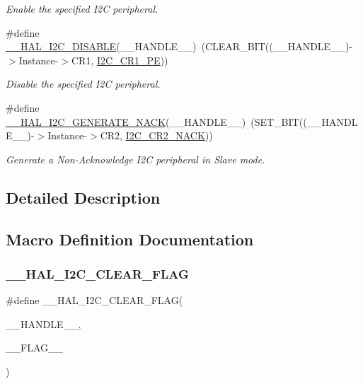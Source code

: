 \begin{DoxyCompactItemize}
\begin{DoxyCompactList}\small\item\em Enable the specified I2C peripheral. \end{DoxyCompactList}\item 
\#define \mbox{\hyperlink{group___i2_c___exported___macros_ga3d6a35da02ca72537a15570912c80412}{\+\_\+\+\_\+\+H\+A\+L\+\_\+\+I2\+C\+\_\+\+D\+I\+S\+A\+B\+LE}}(\+\_\+\+\_\+\+H\+A\+N\+D\+L\+E\+\_\+\+\_\+)~(C\+L\+E\+A\+R\+\_\+\+B\+IT((\+\_\+\+\_\+\+H\+A\+N\+D\+L\+E\+\_\+\+\_\+)-\/$>$Instance-\/$>$C\+R1, \mbox{\hyperlink{group___peripheral___registers___bits___definition_ga953b0d38414808db79da116842ed3262}{I2\+C\+\_\+\+C\+R1\+\_\+\+PE}}))
\begin{DoxyCompactList}\small\item\em Disable the specified I2C peripheral. \end{DoxyCompactList}\item 
\#define \mbox{\hyperlink{group___i2_c___exported___macros_ga11f1b2e130ffa7e62d82ff1ebdb3f4f4}{\+\_\+\+\_\+\+H\+A\+L\+\_\+\+I2\+C\+\_\+\+G\+E\+N\+E\+R\+A\+T\+E\+\_\+\+N\+A\+CK}}(\+\_\+\+\_\+\+H\+A\+N\+D\+L\+E\+\_\+\+\_\+)~(S\+E\+T\+\_\+\+B\+IT((\+\_\+\+\_\+\+H\+A\+N\+D\+L\+E\+\_\+\+\_\+)-\/$>$Instance-\/$>$C\+R2, \mbox{\hyperlink{group___peripheral___registers___bits___definition_ga8bcbbaf564cb68e3afed79c3cd34aa1f}{I2\+C\+\_\+\+C\+R2\+\_\+\+N\+A\+CK}}))
\begin{DoxyCompactList}\small\item\em Generate a Non-\/\+Acknowledge I2C peripheral in Slave mode. \end{DoxyCompactList}\end{DoxyCompactItemize}


\subsection{Detailed Description}


\subsection{Macro Definition Documentation}
\mbox{\label{group___i2_c___exported___macros_ga933e2ea67e86db857a06b70a93be1186}} 
\subsubsection{\texorpdfstring{\_\_HAL\_I2C\_CLEAR\_FLAG}{\_\_HAL\_I2C\_CLEAR\_FLAG}}
{\footnotesize\ttfamily \#define \+\_\+\+\_\+\+H\+A\+L\+\_\+\+I2\+C\+\_\+\+C\+L\+E\+A\+R\+\_\+\+F\+L\+AG(\begin{DoxyParamCaption}\item[{}]{\+\_\+\+\_\+\+H\+A\+N\+D\+L\+E\+\_\+\+\_\+,  }\item[{}]{\+\_\+\+\_\+\+F\+L\+A\+G\+\_\+\+\_\+ }\end{DoxyParamCaption})}

